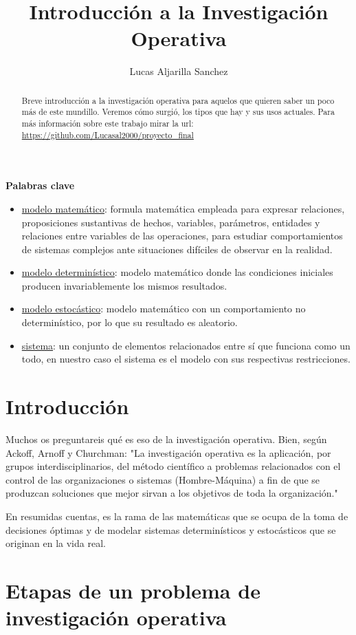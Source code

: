 \documentclass{article}
\author{Lucas Aljarilla Sanchez}
\title{Introducción a la Investigación Operativa}
\begin{document}
\maketitle
\begin{abstract}
Breve introducción a la investigación operativa para aquelos que quieren saber un poco más de este mundillo. Veremos cómo surgió, los tipos que hay y sus usos actuales. Para más información sobre este trabajo mirar la url: \url{https://github.com/Lucasal2000/proyecto_final} 
\end{abstract}
 \vfill
\textbf{Palabras clave}
\begin{itemize}
\item  \underline{modelo matemático}: formula matemática empleada para expresar relaciones, proposiciones sustantivas de hechos, variables, parámetros, entidades y relaciones entre variables de las operaciones, para estudiar comportamientos de sistemas complejos ante situaciones difíciles de observar en la realidad.
\item  \underline{modelo determinístico}: modelo matemático donde las condiciones iniciales producen invariablemente los mismos resultados.
\item  \underline{modelo estocástico}: modelo matemático con un comportamiento no determinístico, por lo que su resultado es aleatorio.
\item  \underline{sistema}: un conjunto de elementos relacionados entre sí que funciona como un todo, en nuestro caso el sistema es el modelo con sus respectivas restricciones. 
\end{itemize}

\section{Introducción}

Muchos os preguntareis qué es eso de la investigación operativa. Bien, según Ackoff, Arnoff y Churchman: "La investigación operativa es la aplicación, por grupos interdisciplinarios, del método científico a problemas relacionados con el control de las organizaciones o sistemas (Hombre-Máquina) a fin de que se produzcan soluciones que mejor sirvan a los objetivos de toda la organización." \cite{Taha2004}

En resumidas cuentas, es la rama de las matemáticas que se ocupa de la toma de decisiones óptimas y de modelar sistemas determinísticos y estocásticos que se originan en la vida real.

\section{Etapas de un problema de investigación operativa} \cite{Luenberger2005}
\end{document}
